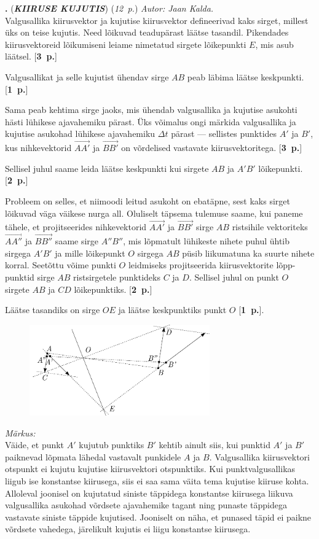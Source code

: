 \documentclass[12pt,a5paper]{article}
\newcommand{\numb}[1]{\textbf{\large #1}}
\newcommand{\nimi}[1]{(\textsl{\small #1})}
\newcommand{\punktid}[1]{(\emph{#1~p.})}
\newcounter{ylesanne}
\newcommand{\yl}[1]{\addtocounter{ylesanne}{1}\newpage\numb{\theylesanne.} \nimi{\textbf{#1}} \newblock{}}
\newcommand{\pp}[1]{[\textbf{#1~p.}]}
\newcommand{\autor}[1]{\emph{ Autor: #1.\\}}
\begin{document}
\yl{KIIRUSE KUJUTIS}\punktid{12}\autor{Jaan Kalda}
Valgusallika kiirusvektor ja kujutise kiirusvektor defineerivad kaks sirget, millest üks on teise kujutis. Need lõikuvad teadupärast läätse tasandil. Pikendades kiirusvektoreid lõikumiseni leiame nimetatud sirgete lõikepunkti $E$, mis asub läätsel. \pp3 \par
Valgusallikat ja selle kujutist ühendav sirge $AB$ peab läbima läätse keskpunkti. \pp1 \par
Sama peab kehtima sirge jaoks, mis ühendab valgusallika ja kujutise asukohti hästi lühikese ajavahemiku pärast. Üks võimalus ongi märkida valgusallika ja kujutise asukohad lühikese ajavahemiku $\Delta t$ pärast --- sellistes punktides $A'$ ja $B'$, kus nihkevektorid  $\vec{AA'}$ ja $\vec{BB'}$ on võrdelised vastavate kiirusvektoritega. \pp3 \par
Sellisel juhul saame leida läätse keskpunkti kui sirgete $AB$ ja $A'B'$ lõikepunkti. \pp2 \par
Probleem on selles, et niimoodi leitud asukoht on ebatäpne, sest kaks sirget lõikuvad väga väikese nurga all. Oluliselt täpsema tulemuse saame, kui paneme tähele, et projitseerides nihkevektorid $\vec{AA'}$ ja $\vec{BB'}$ sirge $AB$ ristsihile vektoriteks $\vec{AA''}$ ja $\vec{BB''}$ saame sirge $A''B''$, mis  lõpmatult lühikeste nihete puhul ühtib sirgega $A'B'$ ja mille lõikepunkt $O$ sirgega $AB$ püsib liikumatuna ka suurte nihete korral. Seetõttu võime punkti $O$ leidmiseks projitseerida kiirusvektorite lõpp-punktid sirge $AB$ ristsirgetele punktideks $C$ ja $D$. Sellisel juhul on punkt $O$ sirgete $AB$ ja $CD$ lõikepunktiks. \pp2 \par
Läätse tasandiks on sirge $OE$ ja läätse keskpunktiks punkt $O$ \pp1.
\begin{figure}[H]
  \centering
  \includegraphics[width=0.69\textwidth]{lxxts-kiirused-lahendus.pdf}
\end{figure}

\emph{Märkus:} \\
Väide, et punkt $A'$ kujutub punktiks $B'$ kehtib ainult siis, kui punktid $A'$ ja $B'$ paiknevad lõpmata lähedal vastavalt punkidele $A$ ja $B$. Valgusallika kiirusvektori otspunkt ei kujutu kujutise kiirusvektori otspunktiks. Kui punktvalgusallikas liigub ise konstantse kiirusega, siis ei saa sama väita tema kujutise kiiruse kohta. Alloleval joonisel on kujutatud siniste täppidega konstantse kiirusega liikuva valgusallika asukohad võrdsete ajavahemike tagant ning punaste täppidega vastavate siniste täppide kujutised. Jooniselt on näha, et punased täpid ei paikne võrdsete vahedega, järelikult kujutis ei liigu konstantse kiirusega.
\end{document}
